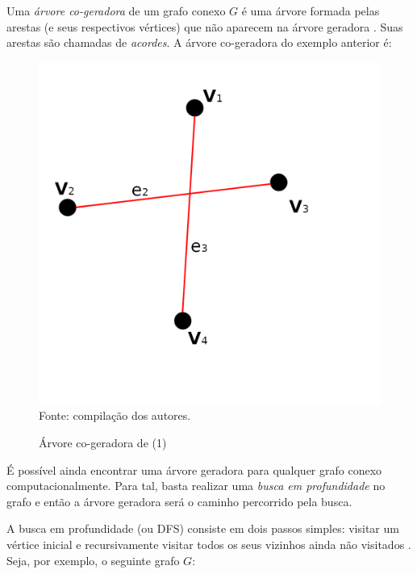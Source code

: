 \documentclass[twocolumn, 10pt]{extarticle}
\begin{document}
Uma \textit{árvore co-geradora} de um grafo conexo $G$ é uma árvore formada pelas arestas (e seus respectivos vértices) que não aparecem na árvore geradora \cite[p. 834]{krishna}. Suas arestas são chamadas de \textit{acordes}. A árvore co-geradora do exemplo anterior é:

\begin{figure}[H]
	\caption{Árvore co-geradora de (1)} 
	\centering
	\includegraphics[scale=0.7]{cospanning1}
	\\ Fonte: compilação dos autores.
\end{figure}

É possível ainda encontrar uma árvore geradora para qualquer grafo conexo computacionalmente. Para tal, basta realizar uma \textit{busca em profundidade} no grafo e então a árvore geradora será o caminho percorrido pela busca.

A busca em profundidade (ou DFS) consiste em dois passos simples: visitar um vértice inicial e recursivamente visitar todos os seus vizinhos ainda não visitados \cite[p. 531]{sedgewick}. Seja, por exemplo, o seguinte grafo $G$:
\end{document}
